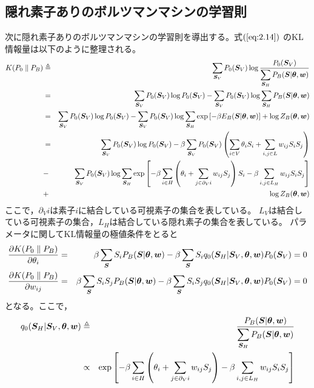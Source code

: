 \subsection{隠れ素子ありのボルツマンマシンの学習則}
次に隠れ素子ありのボルツマンマシンの学習則を導出する。式$(\ref{eq:2.14})$
のKL情報量は以下のように整理される。
\begin{eqnarray}
K(P_{0}\parallel P_{B})&\triangleq&\sum_{\bm{S}_{V}}P_{0}(\bm{S}_{V})
\log\frac{P_{0}(\bm{S}_{V})}{\displaystyle\sum_{\bm{S}_{H}}P_{B}(\bm{S}|\boldsymbol{\theta},\bm{w})}\nonumber\\
&=&\sum_{\bm{S}_{V}}P_{0}(\bm{S}_{V})\log P_{0}(\bm{S}_{V})
-\sum_{\bm{S}_{V}}P_{0}(\bm{S}_{V})\log\sum_{\bm{S}_{H}}P_{B}(\bm{S}|\boldsymbol{\theta},\bm{w})\nonumber\\
&=&\sum_{\bm{S}_{V}}P_{0}(\bm{S}_{V})\log P_{0}(\bm{S}_{V})
-\sum_{\bm{S}_{V}}P_{0}(\bm{S}_{V})\log\sum_{\bm{S}_{H}}\exp
\left[-\beta E_{B}(\bm{S}|\boldsymbol{\theta},\bm{w})\right]
+\log Z_{B}(\boldsymbol{\theta},\bm{w})\nonumber\\
&=&\sum_{\bm{S}_{V}}P_{0}(\bm{S}_{V})\log P_{0}(\bm{S}_{V})
-\beta\sum_{\bm{S}_{V}}P_{0}(\bm{S}_{V})\left(\sum_{i\in
V}\theta_{i}S_{i}+\sum_{i,j\in L}w_{ij}S_{i}S_{j}\right)\nonumber\\
&-&\sum_{\bm{S}_{V}}P_{0}(\bm{S}_{V})\log\sum_{\bm{S}_{H}}
\exp\left[-\beta\sum_{i\in H}\left(\theta_{i}+\sum_{j\in\partial_{V}i}
w_{ij}S_{j}\right)S_{i}-\beta\sum_{i,j\in
L_{H}}w_{ij}S_{i}S_{j}\right]\nonumber\\
&+&\log Z_{B}(\boldsymbol{\theta},\bm{w})\label{eq:2.20}
\end{eqnarray}
ここで，$\partial_{V}i$は素子$i$に結合している可視素子の集合を表している。
$L_{V}$は結合している可視素子の集合，$L_{H}$は結合している隠れ素子の集合を表している。
パラメータに関してKL情報量の極値条件をとると
\begin{eqnarray}
\frac{\partial K(P_{0}\parallel P_{B})}{\partial\theta_{i}}
&=&\beta\sum_{\bm{S}}S_{i}P_{B}(\bm{S}|\boldsymbol{\theta},\bm{w})
-\beta\sum_{\bm{S}}S_{i}q_{0}(\bm{S}_{H}|\bm{S}_{V},\boldsymbol{\theta},\bm{w})P_{0}(\bm{S}_{V})=0
\label{eq:2.21}\nonumber\\
\frac{\partial K(P_{0}\parallel P_{B})}{\partial w_{ij}}
&=&\beta\sum_{\bm{S}}S_{i}S_{j}P_{B}(\bm{S}|\boldsymbol{\theta},\bm{w})
-\beta\sum_{\bm{S}}S_{i}S_{j}q_{0}(\bm{S}_{H}|\bm{S}_{V},\boldsymbol{\theta},\bm{w})P_{0}(\bm{S}_{V})=0
\label{eq:2.22}\nonumber\\
\end{eqnarray}
となる。ここで，
\begin{eqnarray}
q_{0}(\bm{S}_{H}|\bm{S}_{V},\boldsymbol{\theta},\bm{w})&\triangleq&
\frac{P_{B}(\bm{S}|\boldsymbol{\theta},\bm{w})}{\displaystyle\sum_{\bm{S}_{H}}P_{B}(\bm{S}|\boldsymbol{\theta},\bm{w})}\label{eq:2.23}\\
&\propto&\exp\left[-\beta\sum_{i\in H}\left(\theta_{i}
+\sum_{j\in\partial_{V}i}w_{ij}S_{j}\right)-\beta\sum_{i,j\in
L_{H}}w_{ij}S_{i}S_{j}\right]\label{eq:2.24}
\end{eqnarray}
